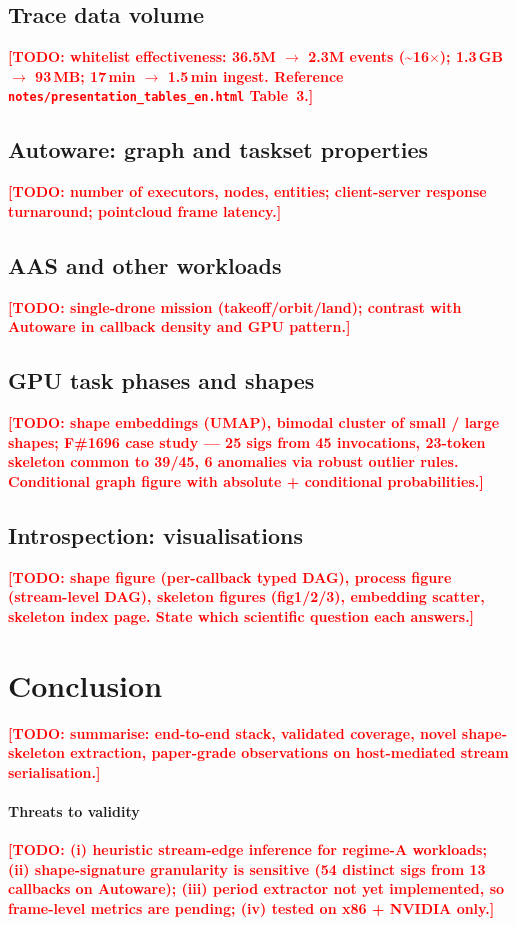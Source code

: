 \documentclass[conference]{IEEEtran}
\newcommand{\todoit}[1]{\textcolor{red}{\textbf{[TODO: #1]}}}
\begin{document}
\subsection{Trace data volume}
\todoit{whitelist effectiveness: 36.5M $\to$ 2.3M events
(\textasciitilde 16$\times$); 1.3\,GB $\to$ 93\,MB; 17\,min $\to$
1.5\,min ingest. Reference
\texttt{notes/presentation\_tables\_en.html} Table~3.}

\subsection{Autoware: graph and taskset properties}
\todoit{number of executors, nodes, entities; client-server response
turnaround; pointcloud frame latency.}

\subsection{AAS and other workloads}
\todoit{single-drone mission (takeoff/orbit/land); contrast with
Autoware in callback density and GPU pattern.}

\subsection{GPU task phases and shapes}
\todoit{shape embeddings (UMAP), bimodal cluster of small / large
shapes; F\#1696 case study --- 25 sigs from 45 invocations, 23-token
skeleton common to 39/45, 6 anomalies via robust outlier rules.
Conditional graph figure with absolute + conditional probabilities.}

\subsection{Introspection: visualisations}
\todoit{shape figure (per-callback typed DAG), process figure
(stream-level DAG), skeleton figures (fig1/2/3), embedding scatter,
skeleton index page. State which scientific question each answers.}

\section{Conclusion}
\todoit{summarise: end-to-end stack, validated coverage, novel
shape-skeleton extraction, paper-grade observations on
host-mediated stream serialisation.}

\paragraph*{Threats to validity}
\todoit{(i) heuristic stream-edge inference for regime-A workloads;
(ii) shape-signature granularity is sensitive (54 distinct sigs from 13
callbacks on Autoware); (iii) period extractor not yet implemented,
so frame-level metrics are pending; (iv) tested on x86 + NVIDIA only.}
\end{document}
